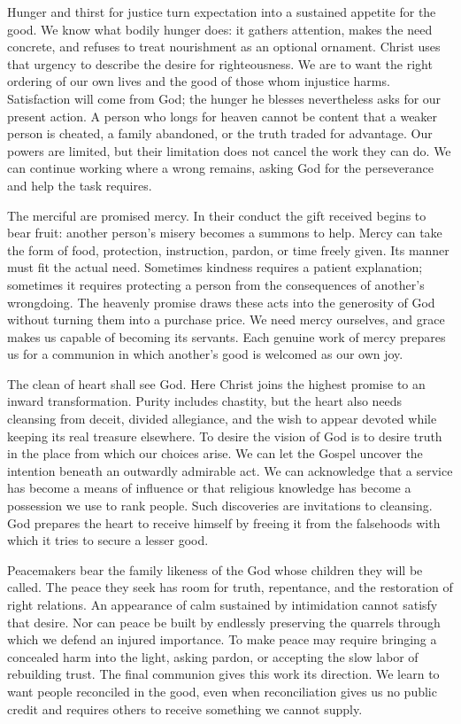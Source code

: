 Hunger and thirst for justice turn expectation into a sustained appetite for the good. We know what bodily hunger does: it gathers attention, makes the need concrete, and refuses to treat nourishment as an optional ornament. Christ uses that urgency to describe the desire for righteousness. We are to want the right ordering of our own lives and the good of those whom injustice harms. Satisfaction will come from God; the hunger he blesses nevertheless asks for our present action. A person who longs for heaven cannot be content that a weaker person is cheated, a family abandoned, or the truth traded for advantage. Our powers are limited, but their limitation does not cancel the work they can do. We can continue working where a wrong remains, asking God for the perseverance and help the task requires.

The merciful are promised mercy. In their conduct the gift received begins to bear fruit: another person's misery becomes a summons to help. Mercy can take the form of food, protection, instruction, pardon, or time freely given. Its manner must fit the actual need. Sometimes kindness requires a patient explanation; sometimes it requires protecting a person from the consequences of another's wrongdoing. The heavenly promise draws these acts into the generosity of God without turning them into a purchase price. We need mercy ourselves, and grace makes us capable of becoming its servants. Each genuine work of mercy prepares us for a communion in which another's good is welcomed as our own joy.

The clean of heart shall see God. Here Christ joins the highest promise to an inward transformation. Purity includes chastity, but the heart also needs cleansing from deceit, divided allegiance, and the wish to appear devoted while keeping its real treasure elsewhere. To desire the vision of God is to desire truth in the place from which our choices arise. We can let the Gospel uncover the intention beneath an outwardly admirable act. We can acknowledge that a service has become a means of influence or that religious knowledge has become a possession we use to rank people. Such discoveries are invitations to cleansing. God prepares the heart to receive himself by freeing it from the falsehoods with which it tries to secure a lesser good.

Peacemakers bear the family likeness of the God whose children they will be called. The peace they seek has room for truth, repentance, and the restoration of right relations. An appearance of calm sustained by intimidation cannot satisfy that desire. Nor can peace be built by endlessly preserving the quarrels through which we defend an injured importance. To make peace may require bringing a concealed harm into the light, asking pardon, or accepting the slow labor of rebuilding trust. The final communion gives this work its direction. We learn to want people reconciled in the good, even when reconciliation gives us no public credit and requires others to receive something we cannot supply.

